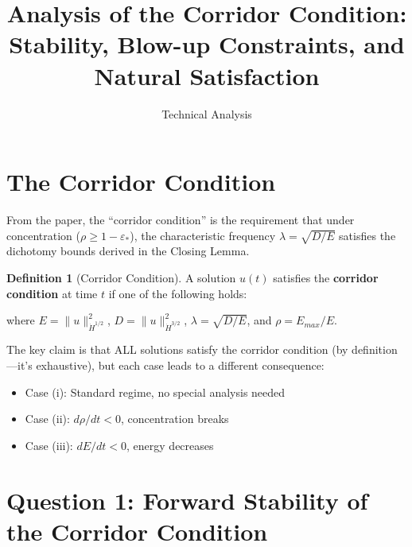 \documentclass[11pt]{article}
\title{Analysis of the Corridor Condition:\\Stability, Blow-up Constraints, and Natural Satisfaction}
\author{Technical Analysis}
\date{}
\theoremstyle{definition}
\newtheorem{definition}[theorem]{Definition}
\begin{document}
\maketitle

\section{The Corridor Condition}

From the paper, the ``corridor condition'' is the requirement that under concentration ($\rho \geq 1 - \varepsilon_*$), the characteristic frequency $\lambda = \sqrt{D/E}$ satisfies the dichotomy bounds derived in the Closing Lemma.

\begin{definition}[Corridor Condition]
A solution $u(t)$ satisfies the \textbf{corridor condition} at time $t$ if one of the following holds:
\begin{enumerate}[label=(\roman*)}
\item \textbf{Non-concentrated:} $\rho(t) < 1 - \varepsilon_*$
\item \textbf{Concentrated, low frequency:} $\rho(t) \geq 1 - \varepsilon_*$ and $\lambda(t) < \lambda_{crit} := c_1/(4\nu)$
\item \textbf{Concentrated, high frequency:} $\rho(t) \geq 1 - \varepsilon_*$ and $\lambda(t) \geq \lambda_{crit}$
\end{enumerate}
where $E = \|u\|_{\dot{H}^{1/2}}^2$, $D = \|u\|_{\dot{H}^{3/2}}^2$, $\lambda = \sqrt{D/E}$, and $\rho = E_{max}/E$.
\end{definition}

The key claim is that ALL solutions satisfy the corridor condition (by definition---it's exhaustive), but each case leads to a different consequence:
\begin{itemize}
\item Case (i): Standard regime, no special analysis needed
\item Case (ii): $d\rho/dt < 0$, concentration breaks
\item Case (iii): $dE/dt < 0$, energy decreases
\end{itemize}

\section{Question 1: Forward Stability of the Corridor Condition}
\end{document}

